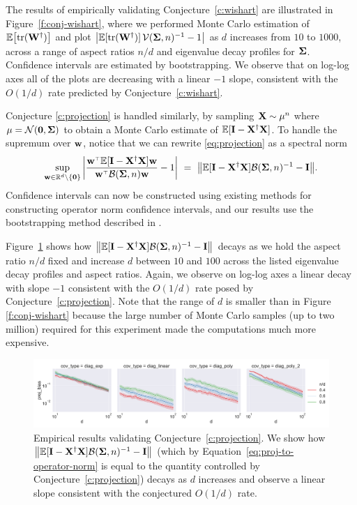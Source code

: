 The results of empirically validating Conjecture~\ref{c:wishart} are
illustrated in Figure~\ref{f:conj-wishart}, where we performed
Monte Carlo estimation of $\mathbb E\big[\mathrm{tr}(\mathbf W^\dagger)\big]$ and
plot $\big|\mathbb E[\mathrm{tr}(\mathbf W^\dagger)]\,\mathcal{V}(\mathbf{\Sigma},n)^{-1} -1\big|$
as $d$ increases from $10$ to $1000$, across a range of aspect ratios $n/d$ and eigenvalue
decay profiles for $\mathbf{\Sigma}$. Confidence intervals are estimated by
bootstrapping. We observe that on log-log axes all of the plots are decreasing with
a linear $-1$ slope, consistent with the $O(1/d)$ rate predicted
by Conjecture~\ref{c:wishart}.


Conjecture \ref{c:projection} is handled similarly, by sampling
$\mathbf X\sim\mu^n$ where $\mu=\mathcal{N}(\mathbf 0,\mathbf{\Sigma} )$ to obtain a Monte Carlo estimate of
$\mathbb E[\mathbf I-\mathbf X^\dagger\mathbf X]$. To handle the supremum over $\mathbf w$, notice that
we can rewrite \eqref{eq:projection} as a spectral norm
\begin{align}
  \sup_{\w\in\R^d\backslash\{\zero\}}\bigg|\frac{\w^\top\E[\I-\X^\dagger\X]\w}{\w^\top
  \Bc(\Sigmab,n)\w} - 1\bigg|
\  =\ \big\|\E[\I-\X^\dagger\X]\Bc(\Sigmab,n)^{-1}
  - \I\big\|.
  \label{eq:proj-to-operator-norm}
\end{align}
Confidence intervals can now be constructed
using existing methods for constructing operator norm
confidence intervals, and our results use the bootstrapping
method described in \cite{lopes2019bootstrapping}.

Figure~\ref{f:conj-bias} shows
how $\big\|\mathbb E[\mathbf I-\mathbf X^\dagger\mathbf X]\mathcal{B}(\mathbf{\Sigma},n)^{-1} - \mathbf I\big\|$ decays as we
hold the aspect ratio $n/d$ fixed and increase $d$ between $10$ and
$100$ across the listed
eigenvalue decay profiles and aspect ratios. Again, we observe on
log-log axes a linear decay with slope $-1$ consistent with the $O(1/d)$
rate posed by Conjecture~\ref{c:projection}. Note that the range of
$d$ is smaller than in Figure \ref{f:conj-wishart} because the large
number of Monte Carlo samples (up to two million) required for this
experiment made the computations much more expensive.

\begin{figure}[H]
  \begin{center}
    \includegraphics[width=\textwidth]{continuous_figures/proj_bias.pdf}
  \end{center}
  \caption{
    Empirical results validating Conjecture~\ref{c:projection}.
We show how
    $\big\|\mathbb E[\mathbf I-\mathbf X^\dagger\mathbf X]\mathcal{B}(\mathbf{\Sigma},n)^{-1} - \mathbf I\big\|$
    (which by Equation~\ref{eq:proj-to-operator-norm}
    is equal to the quantity controlled by Conjecture~\ref{c:projection})
    decays as $d$ increases and observe a linear slope consistent with the conjectured $O(1/d)$ rate.
  }
  \label{f:conj-bias}
\end{figure}
